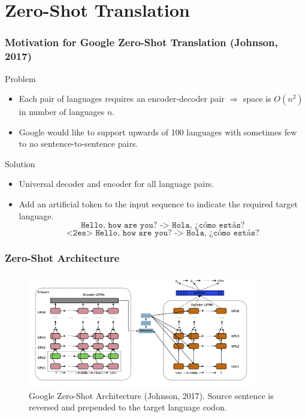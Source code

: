 \documentclass{beamer}
\begin{document}
\section{Zero-Shot Translation}
\begin{frame}
\frametitle{Motivation for Google Zero-Shot Translation (Johnson, 2017)}
Problem
\begin{itemize}
\item Each pair of languages requires an encoder-decoder pair $\Rightarrow$ space is $O(n^2)$ in number of languages $n$.
\item Google would like to support upwards of 100 languages with sometimes few to no sentence-to-sentence pairs. \pause
\end{itemize}
Solution
\begin{itemize}
\item Universal decoder and encoder for all language pairs.
\item Add an artificial token to the input sequence to indicate the required target language.
$$\texttt{Hello, how are you? -> Hola, ¿cómo estás?}$$
$$\texttt{<2es> Hello, how are you? -> Hola, ¿cómo estás?}$$
\end{itemize}
\end{frame}

\begin{frame}
\frametitle{Zero-Shot Architecture}
 \begin{figure}
  \centering
  \includegraphics[width=10cm]{pres_imgs/zero_shot_arch}
  \caption{\label{fig:zero_shot_arch} Google Zero-Shot Architecture (Johnson, 2017). Source sentence is reversed and prepended to the target language codon.}
\end{figure}
\end{frame}
\end{document}
